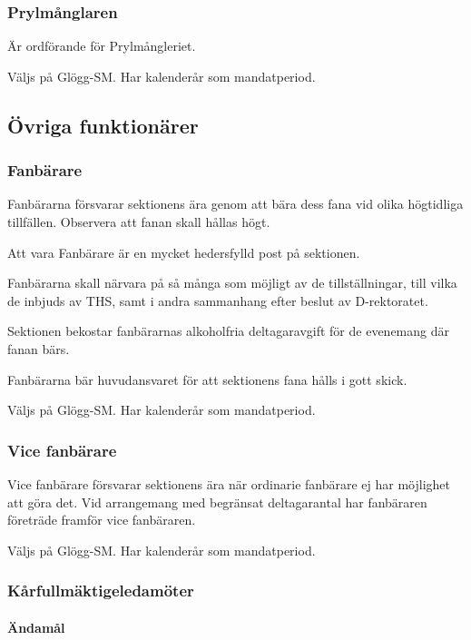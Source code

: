 \documentclass{dgovdoc}
\begin{document}
\subsubsection{Prylmånglaren}
Är ordförande för Prylmångleriet.

Väljs på Glögg-SM. Har kalenderår som mandatperiod.

\subsection{Övriga funktionärer}

\subsubsection{Fanbärare}

Fanbärarna försvarar sektionens ära genom att bära dess fana vid olika
högtidliga tillfällen. Observera att fanan skall hållas högt.

Att vara Fanbärare är en mycket hedersfylld post på sektionen.

Fanbärarna skall närvara på så många som möjligt av de tillställningar, till
vilka de inbjuds av THS, samt i andra sammanhang efter beslut av D-rektoratet.

Sektionen bekostar fanbärarnas alkoholfria deltagaravgift för de evenemang där
fanan bärs.

Fanbärarna bär huvudansvaret för att sektionens fana hålls i gott skick.

Väljs på Glögg-SM. Har kalenderår som mandatperiod.

\subsubsection{Vice fanbärare}

Vice fanbärare försvarar sektionens ära när ordinarie fanbärare ej har
möjlighet att göra det. Vid arrangemang med begränsat deltagarantal har
fanbäraren företräde framför vice fanbäraren.

Väljs på Glögg-SM. Har kalenderår som mandatperiod.

\subsubsection{Kårfullmäktigeledamöter}

\paragraph{Ändamål}
\end{document}
